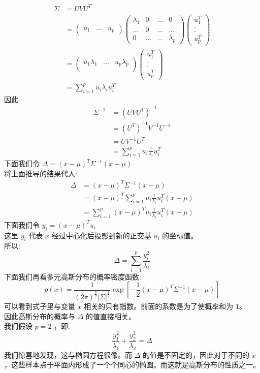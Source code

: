 \documentclass{report}
\begin{document}
$$
\begin{aligned}
\Sigma
&=UVU^T\\
&=
\left ( \begin{matrix}
u_1 & ... & u_p
\end{matrix} \right )
\left ( \begin{matrix}
\lambda_1 & 0 & ... & 0\\
... & 0 & ... & ...\\
0 & ... & ... & \lambda_p
\end{matrix} \right )
\left ( \begin{matrix}
u_1^T \\
.\\
.\\
u_p^T
\end{matrix} \right )\\
&=
\left ( \begin{matrix}
u_1\lambda_1 & ... & u_p \lambda_p\\
\end{matrix} \right )
\left ( \begin{matrix}
u_1^T\\
.\\
.\\
u_p^T
\end{matrix} \right )\\
&=\sum_{i=1}^p u_i\lambda_i u_i^T
\end{aligned}
$$
因此
$$
\begin{aligned}
\Sigma^{-1}
&=(UVU^T)^{-1}\\
&=(U^T)^{-1}V^{-1}U^{-1}\\
&=UV^{-1}U^T\\
&=\sum_{i=1}^p u_i \frac{1}{\lambda_i} u_i^T
\end{aligned}
$$
下面我们令 $\Delta = (x-\mu)^T \Sigma^{-1} (x-\mu)$\\
将上面推导的结果代入:
$$
\begin{aligned}
\Delta
&=(x-\mu)^T \Sigma^{-1} (x-\mu)\\
&=(x-\mu)^T \sum_{i=1}^p u_i \frac{1}{\lambda_i}u_i^T (x-\mu)\\
&=\sum_{i=1}^p(x-\mu)^T u_i \frac{1}{\lambda_i}u_i^T (x-\mu)
\end{aligned}
$$
下面我们令 $y_i=(x-\mu)^T u_i$\\
这里 $y_i$ 代表 $x$ 经过中心化后投影到新的正交基 $u_i$ 的坐标值。\\
所以:
$$
\Delta=\sum_{i=1}^p \frac{y_i^2}{\lambda_i}
$$
下面我们再看多元高斯分布的概率密度函数:
$$
p(x)=\frac{1}{(2\pi)^{\frac{p}{2}}|\Sigma|^{\frac{1}{2}}} \exp[-\frac{1}{2}(x-\mu)^T \Sigma^{-1}(x-\mu)]
$$
可以看到式子里与变量 $x$ 相关的只有指数。前面的系数是为了使概率和为 $1$。\\
因此高斯分布的概率与 $\Delta$ 的值直接相关。\\
我们假设 $p=2$ ，即:
$$
\frac{y_1^2}{\lambda_1}+\frac{y_2^2}{\lambda_2}=\Delta
$$
我们惊喜地发现，这与椭圆方程很像。而 $\Delta$ 的值是不固定的，因此对于不同的 $x$ ，这些样本点于平面内形成了一个个同心的椭圆。而这就是高斯分布的性质之一。
\end{document}
